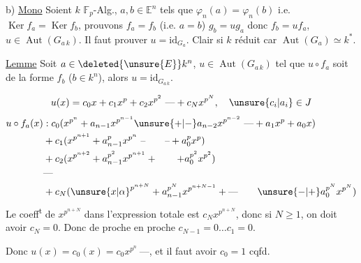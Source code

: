 b) \uline{Mono} Soient  $k$ $\mathbb F_p$-Alg., $a,b\in\mathbb E^n$ tels que $\varphi_n(a)=\varphi_n(b)$ i.e. $\operatorname{Ker}f_a=\operatorname{Ker}f_b$, prouvons $f_a=f_b$ (i.e. $a=b$) 
$g_b=ug_a$ donc $f_b=uf_a$, $u\in\operatorname{Aut}(G_{a\,k})$. Il faut prouver $u=\mathrm{id}_{G_a}$. Clair si $k$ réduit car $\operatorname{Aut}(G_a)\simeq k^*$.

\uline{Lemme} Soit $a\in\deleted{\unsure{E}}k^n$, $u\in\operatorname{Aut}(G_{a\,k})$ tel que $u\circ f_a$ soit de la forme $f_b$ ($b\in k^n$), alors $u=\mathrm{id}_{G_{a\,k}}$.

\[
u(x)=c_0x+c_1x^p+c_2x^{p^2}\ \text{---}+c_Nx^{p^N},\quad \unsure{c_i|a_i}\in J
\]
\[
\begin{aligned}
u\circ f_a(x)&\mathrel{{:}}c_0(x^{p^n}+a_{n-1}x^{p^{n-1}}\unsure{+|-}a_{n-2}x^{p^{n-2}}\ \text{---}+a_1x^p+a_0x)\\
&+c_1(x^{p^{n+1}}+a_{n-1}^{p}x^{p^n}\ \text{--}\qquad\text{--}+a_0^p x^p)\\
&+c_2(x^{p^{n+2}}+a_{n-1}^{p^2}x^{p^{n+1}}+\qquad +a_0^{p^2}x^{p^2})\\
&\text{---}\\
&+c_N({\unsure{x|\alpha}}^{p^{n+N}}+a_{n-1}^{p^N}x^{p^{n+N-1}}+\text{---}\qquad \unsure{-|+}a_0^{p^N}x^{p^N})
\end{aligned}
\]
Le coeff\textsuperscript{t} de $x^{p^{n+N}}$ dans l'expression totale est $c_N x^{p^{n+N}}$, donc  si $N\geq 1$, on doit avoir $c_N=0$. Donc de proche en proche $c_{N-1}=0\ldots c_1=0$.

Donc $u(x)=c_0(x)=c_0 x^{p^n}\ \text{---}$, et il faut avoir $c_0=1$ cqfd.

